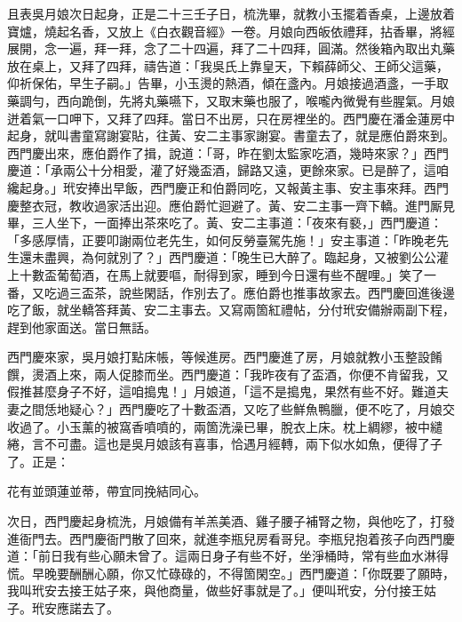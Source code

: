 且表吳月娘次日起身，正是二十三壬子日，梳洗畢，就教小玉擺着香桌，上邊放着寶爐，燒起名香，又放上《白衣觀音經》一卷。月娘向西皈依禮拜，拈香畢，將經展開，念一遍，拜一拜，念了二十四遍，拜了二十四拜，圓滿。然後箱內取出丸藥放在桌上，又拜了四拜，禱告道：「我吳氏上靠皇天，下賴薛師父、王師父這藥，{}仰祈保佑，早生子嗣。」告畢，小玉燙的熱酒，傾在盞內。月娘接過酒盞，一手取藥調勻，西向跪倒，先將丸藥嚥下，又取末藥也服了，喉嚨內微覺有些腥氣。{}月娘迸着氣一口呷下，{}又拜了四拜。當日不出房，只在房裡坐的。西門慶在潘金蓮房中起身，就叫書童寫謝宴貼，往黃、安二主事家謝宴。書童去了，就是應伯爵來到。西門慶出來，應伯爵作了揖，說道：「哥，昨在劉太監家吃酒，幾時來家？」西門慶道：「承兩公十分相愛，灌了好幾盃酒，歸路又遠，更餘來家。已是醉了，這咱纔起身。」玳安捧出早飯，西門慶正和伯爵同吃，又報黃主事、安主事來拜。西門慶整衣冠，教收過家活出迎。應伯爵忙迴避了。黃、安二主事一齊下轎。進門厮見畢，三人坐下，一面捧出茶來吃了。黃、安二主事道：「夜來有褻，」西門慶道：「多感厚情，正要叩謝兩位老先生，如何反勞臺駕先施！」安主事道：「昨晚老先生還未盡興，為何就別了？」西門慶道：「晚生已大醉了。臨起身，又被劉公公灌上十數盃葡萄酒，在馬上就要嘔，耐得到家，睡到今日還有些不醒哩。」笑了一番，又吃過三盃茶，說些閑話，作別去了。應伯爵也推事故家去。西門慶回進後邊吃了飯，就坐轎答拜黃、安二主事去。又寫兩箇紅禮帖，分付玳安備辦兩副下程，趕到他家面送。當日無話。

西門慶來家，吳月娘打點床帳，等候進房。西門慶進了房，月娘就教小玉整設餚饌，燙酒上來，兩人促膝而坐。西門慶道：「我昨夜有了盃酒，你便不肯留我，又假推甚麼身子不好，這咱搗鬼！」月娘道，「這不是搗鬼，果然有些不好。難道夫妻之間恁地疑心？」西門慶吃了十數盃酒，又吃了些鮮魚鴨臘，便不吃了，月娘交收過了。小玉薰的被窩香噴噴的，兩箇洗澡已畢，脫衣上床。枕上綢繆，被中繾綣，言不可盡。這也是吳月娘該有喜事，恰遇月經轉，兩下似水如魚，便得了子了。{}正是：

\begin{myquote}
花有並頭蓮並蒂，帶宜同挽結同心。
\end{myquote}

次日，西門慶起身梳洗，月娘備有羊羔美酒、雞子腰子補腎之物，與他吃了，打發進衙門去。西門慶衙門散了回來，就進李瓶兒房看哥兒。李瓶兒抱着孩子向西門慶道：「前日我有些心願未曾了。這兩日身子有些不好，坐淨桶時，常有些血水淋得慌。早晚要酬酬心願，你又忙碌碌的，不得箇閑空。」西門慶道：「你既要了願時，我叫玳安去接王姑子來，{}與他商量，做些好事就是了。」便叫玳安，分付接王姑子。玳安應諾去了。

